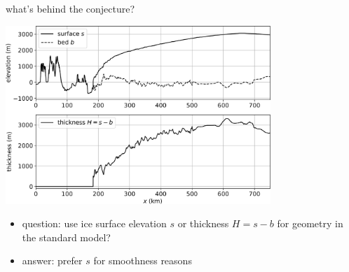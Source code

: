 \documentclass[10pt,svgnames]{beamer}
\begin{document}
\begin{frame}{what's behind the conjecture?}

\bigskip
\begin{center}
\includegraphics[width=0.75\textwidth]{giscross}
\end{center}

\begin{itemize}
\item question: use ice surface elevation $s$ or thickness $H = s - b$ for geometry in the standard model?
\item answer: prefer $s$ for smoothness reasons
\end{itemize}
\end{frame}
\end{document}
